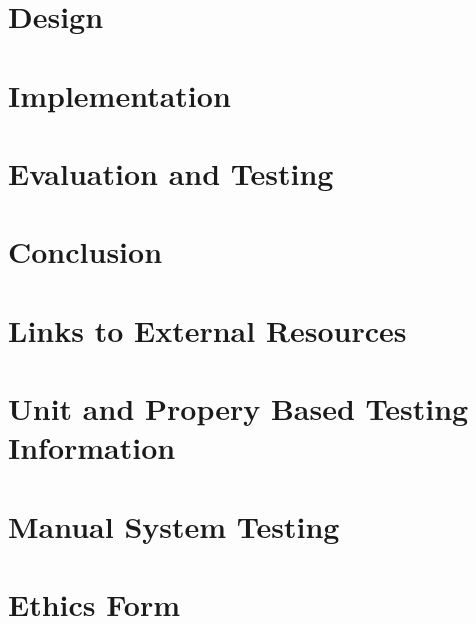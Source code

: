 \documentclass{l4proj}
\begin{document}
\chapter{Design}

\chapter{Implementation}

\chapter{Evaluation and Testing} 

\chapter{Conclusion}    

%
% 

\begin{appendices}

\chapter{Links to External Resources}

\chapter{Unit and Propery Based Testing Information}

\chapter{Manual System Testing}

\chapter{Ethics Form}

\end{appendices}






\end{document}
